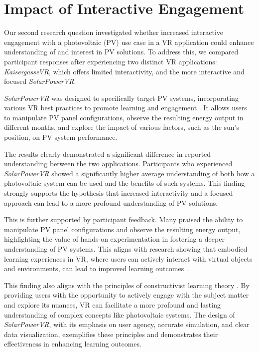 \documentclass[draft, final]{vutinfth} %
\begin{document}
\section{Impact of Interactive Engagement}

Our second research question investigated whether increased interactive engagement with a photovoltaic (PV) use case in a VR application could enhance understanding of and interest in PV solutions. To address this, we compared participant responses after experiencing two distinct VR applications: \textit{KaisergasseVR}, which offers limited interactivity, and the more interactive and focused \textit{SolarPowerVR}.

\textit{SolarPowerVR} was designed to specifically target PV systems, incorporating various VR best practices to promote learning and engagement \cite{Dalgarno2010Learning, Gee2009Deep}. It allows users to manipulate PV panel configurations, observe the resulting energy output in different months, and explore the impact of various factors, such as the sun's position, on PV system performance.

The results clearly demonstrated a significant difference in reported understanding between the two applications. Participants who experienced \textit{SolarPowerVR} showed a significantly higher average understanding of both how a photovoltaic system can be used and the benefits of such systems. This finding strongly supports the hypothesis that increased interactivity and a focused approach can lead to a more profound understanding of PV solutions.

This is further supported by participant feedback. Many praised the ability to manipulate PV panel configurations and observe the resulting energy output, highlighting the value of hands-on experimentation in fostering a deeper understanding of PV systems. This aligns with research showing that embodied learning experiences in VR, where users can actively interact with virtual objects and environments, can lead to improved learning outcomes \cite{Sung2015Effects, Winn2002Immersion}.

This finding also aligns with the principles of constructivist learning theory \cite{Mikropoulos2011VrEducational}. By providing users with the opportunity to actively engage with the subject matter and explore its nuances, VR can facilitate a more profound and lasting understanding of complex concepts like photovoltaic systems. The design of \textit{SolarPowerVR}, with its emphasis on user agency, accurate simulation, and clear data visualization, exemplifies these principles and demonstrates their effectiveness in enhancing learning outcomes.
\end{document}
